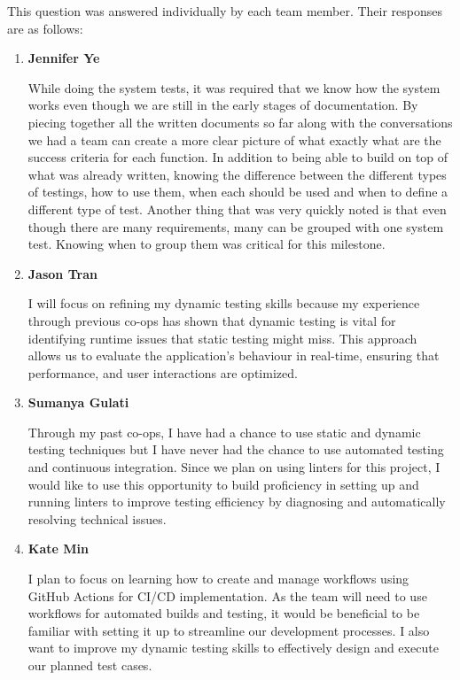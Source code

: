 \documentclass[12pt, titlepage]{article}
\begin{document}
\begin{enumerate}
    This question was answered individually by each team member. Their responses
    are as follows:
    \begin{enumerate}
      \item \textbf{Jennifer Ye}
        
        While doing the system tests, it was required that we know how the
        system works even though we are still in the early stages of
        documentation. By piecing together all the written documents so far
        along with the conversations we had a team can create a more clear
        picture of what exactly what are the success criteria for each function.
        In addition to being able to build on top of what was already written,
        knowing the difference between the different types of testings, how to
        use them, when each should be used and when to define a different type
        of test. Another thing that was very quickly noted is that even though
        there are many requirements, many can be grouped with one system test.
        Knowing when to group them was critical for this milestone.

      \item \textbf{Jason Tran}
      
        I will focus on refining my dynamic testing skills because my experience
        through previous co-ops has shown that dynamic testing is vital for
        identifying runtime issues that static testing might miss. This approach
        allows us to evaluate the application's behaviour in real-time, ensuring
        that performance, and user interactions are optimized.

      \item \textbf{Sumanya Gulati}
      
        Through my past co-ops, I have had a chance to use static and dynamic
        testing techniques but I have never had the chance to use automated
        testing and continuous integration. Since we plan on using linters for
        this project, I would like to use this opportunity to build proficiency in
        setting up and running linters to improve testing efficiency by diagnosing
        and automatically resolving technical issues. 

      \item \textbf{Kate Min}
      
        I plan to focus on learning how to create and manage workflows using
        GitHub Actions for CI/CD implementation. As the team will need to use
        workflows for automated builds and testing, it would be beneficial to be
        familiar with setting it up to streamline our development processes. I
        also want to improve my dynamic testing skills to effectively design and
        execute our planned test cases.
    \end{enumerate}


\end{enumerate}
\end{document}
